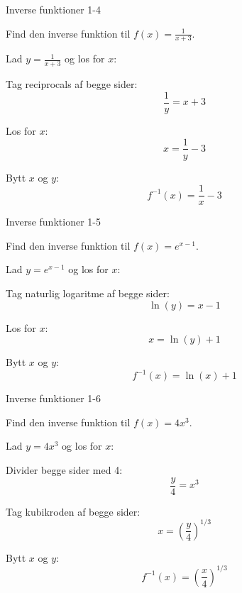 \documentclass{article}
\begin{document}
\newpage

\begin{exercise}{Inverse funktioner 1-4}

Find den inverse funktion til $f(x) = \frac{1}{x + 3}$.


\hint

Lad $y = \frac{1}{x + 3}$ og los for $x$:

\hint

Tag reciprocals af begge sider:
\[
\frac{1}{y} = x + 3
\]

\hint

Los for $x$:
\[
x = \frac{1}{y} - 3
\]

\hint

Bytt $x$ og $y$:
\[
f^{-1}(x) = \frac{1}{x} - 3
\]

\end{exercise}

\newpage

\begin{exercise}{Inverse funktioner 1-5}

Find den inverse funktion til $f(x) = e^{x - 1}$.


\hint

Lad $y = e^{x - 1}$ og los for $x$:

\hint

Tag naturlig logaritme af begge sider:
\[
\ln(y) = x - 1
\]

\hint

Los for $x$:
\[
x = \ln(y) + 1
\]

\hint

Bytt $x$ og $y$:
\[
f^{-1}(x) = \ln(x) + 1
\]

\end{exercise}

\newpage

\begin{exercise}{Inverse funktioner 1-6}

Find den inverse funktion til $f(x) = 4x^3$.


\hint

Lad $y = 4x^3$ og los for $x$:

\hint

Divider begge sider med 4:
\[
\frac{y}{4} = x^3
\]

\hint

Tag kubikroden af begge sider:
\[
x = \left(\frac{y}{4}\right)^{1/3}
\]

\hint

Bytt $x$ og $y$:
\[
f^{-1}(x) = \left(\frac{x}{4}\right)^{1/3}
\]

\end{exercise}
\end{document}
